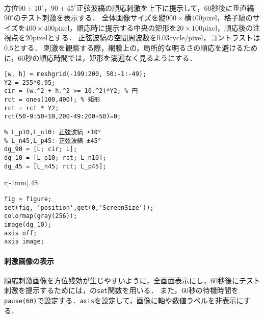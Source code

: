 \paragraph{\kadaicb}
方位\(90\pm 10^\circ\)，\(90\pm 45^\circ\)正弦波縞の順応刺激を上下に提示して，\(60\)秒後に垂直縞\(90^\circ\)のテスト刺激を表示する．
全体画像サイズを\(\textrm{縦}900\times\textrm{横}400\textrm{pixel}\)，格子縞のサイズを\(400\times 400\textrm{pixel}\)，順応時に提示する中央の矩形を\(20\times 100\textrm{pixel}\)，順応後の注視点を\(20\textrm{pixel}\)とする．
正弦波縞の空間周波数を\(0.03\textrm{cycle}/\textrm{pixel}\)，コントラストは\(0.5\)とする．
刺激を観察する際，網膜上の，局所的な明るさの順応を避けるために，\(60\)秒の順応時間では，矩形を満遍なく見るようにする．
\begin{center}
    \begin{minipage}[t]{.48\textwidth}
        \begin{lstlisting}[caption={矩形と円の作成},label={src:矩形と円の作成}]
[w, h] = meshgrid(-199:200, 50:-1:-49);
Y2 = 255*0.95;
cir = (w.^2 + h.^2 >= 10.^2)*Y2; % 円
rct = ones(100,400); % 矩形
rct = rct * Y2;
rct(50-9:50+10,200-49:200+50)=0;
        \end{lstlisting}
    \end{minipage}
    \hspace{.5em}
    \begin{minipage}[t]{.48\textwidth}
        \begin{lstlisting}[caption={順応刺激画像の作成},label={src:順応刺激画像の作成}]
% L: 正弦波縞 90°
% L_p10,L_n10: 正弦波縞 ±10° 
% L_n45,L_p45: 正弦波縞 ±45°
dg_90 = [L; cir; L];
dg_10 = [L_p10; rct; L_n10];
dg_45 = [L_n45; rct; L_p45];
        \end{lstlisting}
    \end{minipage}
    \vspace{-.5em}
\end{center}
\newpage
\begin{wrapfigure}{r}[-1mm]{.48\textwidth}
    \vspace{-1cm}
    \begin{lstlisting}[caption={刺激画像の表示方法},label={src:刺激画像の表示方法}]
fig = figure;
set(fig, 'position',get(0,'ScreenSize'));
colormap(gray(256));
image(dg_10);
axis off;
axis image;    
    \end{lstlisting}
    \vspace{-.5cm}
\end{wrapfigure}
\paragraph{刺激画像の表示}
順応刺激画像を方位残効が生じやすいように，全画面表示にし，\(60\)秒後にテスト刺激を提示するためには，\matlab の\texttt{set}関数を用いる．
また，\(60\)秒の待機時間を\texttt{pause(60)}で設定する．\texttt{axis}を設定して，画像に軸や数値ラベルを非表示にする．
